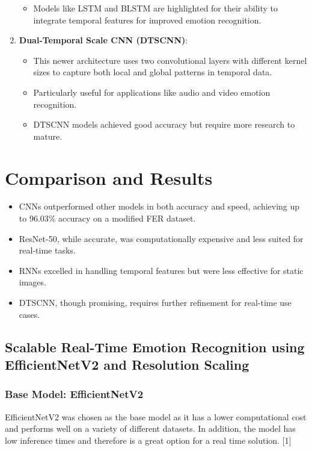 \documentclass{article}
\begin{document}
\begin{enumerate}
\begin{itemize}
        \item Models like LSTM and BLSTM are highlighted for their ability to integrate temporal features for improved emotion recognition.
    \end{itemize}
    \item \textbf{Dual-Temporal Scale CNN (DTSCNN)}:
    \begin{itemize}
        \item This newer architecture uses two convolutional layers with different kernel sizes to capture both local and global patterns in temporal data.
        \item Particularly useful for applications like audio and video emotion recognition.
        \item DTSCNN models achieved good accuracy but require more research to mature.
    \end{itemize}
\end{enumerate}

\section*{Comparison and Results}
\begin{itemize}
    \item CNNs outperformed other models in both accuracy and speed, achieving up to 96.03\% accuracy on a modified FER dataset.
    \item ResNet-50, while accurate, was computationally expensive and less suited for real-time tasks.
    \item RNNs excelled in handling temporal features but were less effective for static images.
    \item DTSCNN, though promising, requires further refinement for real-time use cases.
\end{itemize}

\subsection*{Scalable Real-Time Emotion Recognition using EfficientNetV2 and Resolution Scaling}

\subsubsection*{Base Model: EfficientNetV2}
EfficientNetV2 was chosen as the base model as it has a lower computational cost and performs well on a variety of different datasets.
In addition, the model has low inference times and therefore is a great option for a real time solution. [1]
\end{document}

